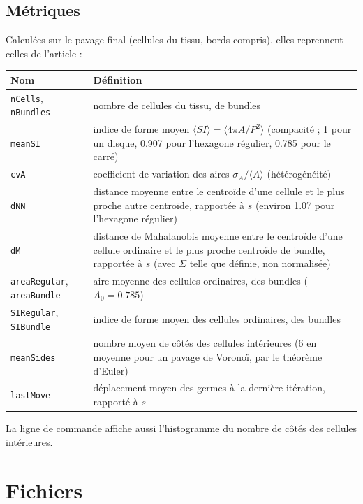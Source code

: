 \documentclass[10pt,a4paper]{article}
\newcommand{\code}[1]{\texttt{#1}}
\begin{document}
\subsection{Métriques}\label{sec:metriques}

Calculées sur le pavage final (cellules du tissu, bords compris), elles reprennent celles de l'article :
\begin{center}
\begin{tabularx}{\linewidth}{@{}lX@{}}
  \toprule
  Nom & Définition \\
  \midrule
  \code{nCells}, \code{nBundles} & nombre de cellules du tissu, de bundles \\
  \code{meanSI} & indice de forme moyen $\langle SI\rangle=\langle4\pi A/P^2\rangle$ (compacité ; 1 pour un disque,
    0.907 pour l'hexagone régulier, 0.785 pour le carré) \\
  \code{cvA} & coefficient de variation des aires $\sigma_A/\langle A\rangle$ (hétérogénéité) \\
  \code{dNN} & distance moyenne entre le centroïde d'une cellule et le plus proche autre centroïde, rapportée à $s$
    (environ 1.07 pour l'hexagone régulier) \\
  \code{dM} & distance de Mahalanobis moyenne entre le centroïde d'une cellule ordinaire et le plus proche centroïde de
    bundle, rapportée à $s$ (avec $\Sigma$ telle que définie, non normalisée) \\
  \code{areaRegular}, \code{areaBundle} & aire moyenne des cellules ordinaires, des bundles ($A_0=0.785$) \\
  \code{SIRegular}, \code{SIBundle} & indice de forme moyen des cellules ordinaires, des bundles \\
  \code{meanSides} & nombre moyen de côtés des cellules intérieures (6 en moyenne pour un pavage de Voronoï,
    par le théorème d'Euler) \\
  \code{lastMove} & déplacement moyen des germes à la dernière itération, rapporté à $s$ \\
  \bottomrule
\end{tabularx}
\end{center}
La ligne de commande affiche aussi l'histogramme du nombre de côtés des cellules intérieures.

\section{Fichiers}\label{sec:fichiers}
\end{document}
